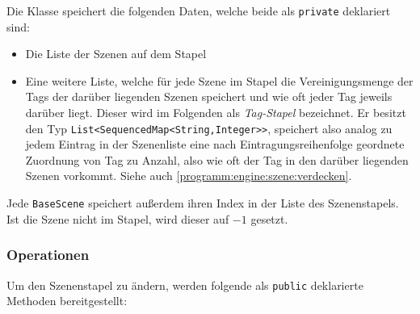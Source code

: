 \begin{sloppypar}
Die Klasse speichert die folgenden Daten, welche beide als \texttt{private}
deklariert sind:

\begin{itemize}
	\item Die Liste der Szenen auf dem Stapel
	\item Eine weitere Liste, welche für jede Szene im Stapel
	      die Vereinigungsmenge der Tags der darüber liegenden
	      Szenen speichert und wie oft jeder Tag jeweils darüber
	      liegt. Dieser wird im Folgenden als \textit{Tag-Stapel}
	      bezeichnet. Er besitzt den Typ \texttt{List<SequencedMap<String,Integer>{>}},
	      speichert also analog zu jedem Eintrag in der Szenenliste
	      eine nach Eintragungsreihenfolge geordnete Zuordnung
	      von Tag zu Anzahl, also wie oft der Tag in den darüber
	      liegenden Szenen vorkommt.
	      Siehe auch \ref{programm:engine:szene:verdecken}.
\end{itemize}

Jede \texttt{BaseScene} speichert außerdem ihren Index in der
Liste des Szenenstapels. Ist die Szene nicht im Stapel, wird
dieser auf $-1$ gesetzt.


\subsubsection{Operationen}

Um den Szenenstapel zu ändern, werden folgende als
\texttt{public} deklarierte Methoden bereitgestellt:


\end{sloppypar}
